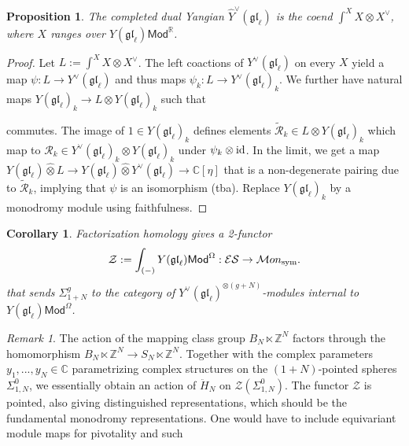 \documentclass[11pt]{report}
\newtheorem{prop}[theorem]{Proposition}
\newtheorem{corollary}[theorem]{Corollary}
\theoremstyle{definition}
\theoremstyle{remark}
\newtheorem*{remark}{Remark}
\theoremstyle{remark}
\newcommand{\id}{\textnormal{id}}
\newcommand{\Z}{\mathbb{Z}}
\newcommand{\R}{\mathbb{R}}
\newcommand{\C}{\mathbb{C}}
\begin{document}
\begin{prop}
The completed dual Yangian $\hat Y^\vee(\mathfrak{gl}_\ell)$ is the coend $\int^X X \otimes X^\vee$, where $X$ ranges over $Y(\mathfrak{gl}_\ell)\mathsf{Mod}^\R$.
\end{prop}

\begin{proof}
Let $L := \int^X X \otimes X^\vee$. The left coactions of $Y^\vee(\mathfrak{gl}_\ell)$ on every $X$ yield a map $\psi: L \to Y^\vee(\mathfrak{gl}_\ell)$ and thus maps $\psi_k: L \to Y^\vee(\mathfrak{gl}_\ell)_k$. We further have natural maps $Y(\mathfrak{gl}_\ell)_k \to L \otimes Y(\mathfrak{gl}_\ell)_k$ such that
\begin{center}
\end{center}
commutes. The image of $1 \in Y(\mathfrak{gl}_\ell)_k$ defines elements $\widetilde{\mathcal{R}}_k \in L \otimes Y(\mathfrak{gl}_\ell)_k$ which map to $\mathcal{R}_k \in Y^\vee(\mathfrak{gl}_\ell)_k \otimes Y(\mathfrak{gl}_\ell)_k$ under $\psi_k \otimes \id$. In the limit, we get a map $Y(\mathfrak{gl}_\ell) \operatorname{\hat{\otimes}} L \to Y(\mathfrak{gl}_\ell) \operatorname{\hat{\otimes}} Y^\vee(\mathfrak{gl}_\ell) \to \C[\eta]$ that is a non-degenerate pairing due to $\widetilde{\mathcal{R}}_k$, implying that $\psi$ is an isomorphism (tba). Replace $Y(\mathfrak{gl}_\ell)_k$ by a monodromy module using faithfulness.
\end{proof}

\begin{corollary}
Factorization homology gives a 2-functor
\begin{equation*}
\mathcal{Z} := \int_{(-)} Y(\mathfrak{gl}_\ell)\mathsf{Mod}^\Omega: \mathcal{ES} \to \mathcal{M}on_\textnormal{sym}.
\end{equation*}
that sends $\Sigma_{1+N}^g$ to the category of $Y^\vee(\mathfrak{gl}_\ell)^{\otimes (g+N)}$-modules internal to $Y(\mathfrak{gl}_\ell)\mathsf{Mod}^\Omega$.
\end{corollary}

\begin{remark}
The action of the mapping class group $B_N \ltimes \Z^N$ factors through the homomorphism $B_N \ltimes \Z^N \to S_N \ltimes \Z^N$. Together with the complex parameters $y_1,...,y_N \in \C$ parametrizing complex structures on the $(1+N)$-pointed spheres $\Sigma_{1,N}^0$, we essentially obtain an action of $\ddot H_N$ on $\mathcal{Z}(\Sigma_{1,N}^0)$. The functor $\mathcal{Z}$ is pointed, also giving distinguished representations, which should be the fundamental monodromy representations. One would have to include equivariant module maps for pivotality and such
\end{remark}
\end{document}
